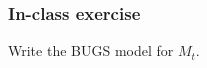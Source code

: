 \documentclass[color=usenames,dvipsnames]{beamer}\usepackage[]{graphicx}\usepackage[]{xcolor}
\begin{document}















\begin{frame}
  \frametitle{In-class exercise}
  \centering
  \large
  Write the BUGS model for $M_t$. \\
\end{frame}
\end{document}
